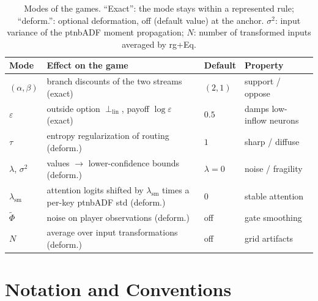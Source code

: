 \begin{table}[t]
    \centering
    \caption{Modes of the games. ``Exact'': the mode stays within a represented rule; ``deform.'':
    optional deformation, off (default value) at the anchor. $\sigma^2$: input variance of the \ac{ptnbADF}
    moment propagation; $N$: number of transformed inputs averaged by \ac{rg}+Eq.}\label{ptnb:tab:modes}
    \small
    \setlength{\tabcolsep}{4pt}
    \begin{tabularx}{\textwidth}{@{}>{\raggedright\arraybackslash}p{}>{\raggedright\arraybackslash}X>{\raggedright\arraybackslash}p{}>{\raggedright\arraybackslash}p{}@{}}
        \toprule
        \textbf{Mode} & \textbf{Effect on the game} & \textbf{Default} & \textbf{Property} \\
        \midrule
        $(\alpha,\beta)$ & branch discounts of the two streams (exact) & $(2,1)$ & support / oppose \\
        $\varepsilon$ & outside option $\perp_{\mathrm{lin}}$, payoff $\log\varepsilon$ (exact) & $0.5$ &
        damps low-inflow neurons \\
        $\tau$ & entropy regularization of routing (deform.) & $1$ & sharp / diffuse \\
        $\lambda$, $\sigma^2$ & values $\to$ lower-confidence bounds (deform.) & $\lambda{=}0$ & noise /
        fragility \\
        $\lambda_{\mathrm{sm}}$ & attention logits shifted by $\lambda_{\mathrm{sm}}$ times a per-key
        \ac{ptnbADF} std (deform.) & $0$ & stable attention \\
        $\tilde\Phi$ & noise on player observations (deform.) & off & gate smoothing \\
        $N$ & average over input transformations (deform.) & off & grid artifacts \\
        \bottomrule
    \end{tabularx}
\end{table}


\section{Notation and Conventions}\label{ptnb:app:notation}\label{ptnb:app:notation-identities}

